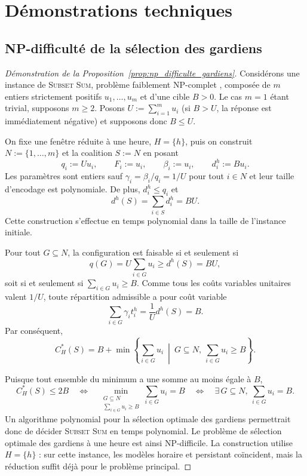 \section{Démonstrations techniques}
\label{app:demonstrations_techniques}

\subsection{NP-difficulté de la sélection des gardiens}
\label{app:preuve_np_difficulte}

\begin{proof}[Démonstration de la Proposition~\ref{prop:np_difficulte_gardiens}]
Considérons une instance de \textsc{Subset Sum}, problème faiblement
NP-complet \cite{garey-johnson-1979}, composée de $m$ entiers strictement
positifs $u_1,\ldots,u_m$ et d'une cible $B>0$. Le cas \(m=1\) étant
trivial, supposons \(m\geqslant2\). Posons
$U:=\sum_{i=1}^m u_i$ (si $B>U$, la réponse est immédiatement négative)
et supposons donc $B\leqslant U$.

On fixe une fenêtre réduite à une heure, \(H=\{h\}\), puis on construit
$N:=\{1,\ldots,m\}$ et la coalition $S:=N$ en posant
\[
q_i:=Uu_i,\qquad
F_i:=u_i,\qquad
\beta_i:=u_i,\qquad
d_i^h:=Bu_i.
\]
Les paramètres sont entiers sauf $\gamma_i=\beta_i/q_i=1/U$ pour tout $i\in N$
et leur taille d'encodage est polynomiale. De plus,
$d_i^h\leqslant q_i$ et
\[
d^h(S)=\sum_{i\in S}d_i^h=BU.
\]
Cette construction s'effectue en temps polynomial dans la taille de
l'instance initiale.

Pour tout $G\subseteq N$, la configuration est faisable si et seulement si
\[
q(G)=U\sum_{i\in G}u_i\geqslant d^h(S)=BU,
\]
soit si et seulement si $\sum_{i\in G}u_i\geqslant B$. Comme tous les
coûts variables unitaires valent $1/U$, toute répartition admissible a
pour coût variable
\[
\sum_{i\in G}\gamma_i t_i^h
=\frac{1}{U}d^h(S)=B.
\]
Par conséquent,
\[
C_H^*(S)
=B+\min\left\{
\sum_{i\in G}u_i\ \middle|\
G\subseteq N,\ \sum_{i\in G}u_i\geqslant B
\right\}.
\]

Puisque tout ensemble du minimum a une somme au moins égale à $B$,
\[
C_H^*(S)\leqslant2B
\quad\Longleftrightarrow\quad
\min_{\substack{G\subseteq N\\ \sum_{i\in G}u_i\geqslant B}}
\sum_{i\in G}u_i=B
\quad\Longleftrightarrow\quad
\exists\,G\subseteq N,\ \sum_{i\in G}u_i=B.
\]
Un algorithme polynomial pour la sélection optimale des gardiens
permettrait donc de décider \textsc{Subset Sum} en temps polynomial. Le
problème de sélection optimale des gardiens à une heure est ainsi
NP-difficile. La construction utilise \(H=\{h\}\) : sur cette instance, les
modèles horaire et persistant coïncident, mais la réduction suffit déjà pour
le problème principal.
\end{proof}

